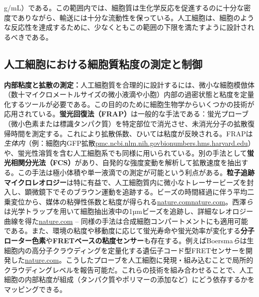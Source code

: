 \begin{itemize}
g/mL）である。この範囲内では、細胞質は生化学反応を促進するのに十分な密度でありながら、輸送には十分な流動性を保っている。人工細胞は、細胞のような反応性を達成するために、少なくともこの範囲の下限を満たすように設計されるべきである。
\end{itemize}

\subsection{人工細胞における細胞質粘度の測定と制御}

\textbf{内部粘度と拡散の測定：}人工細胞質を合理的に設計するには、微小な細胞模倣体（数十マイクロメートルサイズの微小液滴や小胞）内部の過密状態と粘度を定量化するツールが必要である。この目的のために細胞生物学からいくつかの技術が応用されている。\textbf{蛍光回復法（FRAP）}は一般的な手法である：蛍光プローブ（微小色素または標識タンパク質）を特定部位で消光させ、未消光分子の拡散復帰時間を測定する。これにより拡散係数、ひいては粘度が反映される。FRAPは\textit{生体内}（例：細胞内GFP拡散\href{https://pmc.ncbi.nlm.nih.gov/articles/PMC1184383/\#:~:text=Photobleaching\%20recovery\%20and\%20anisotropy\%20decay,2}{pmc.ncbi.nlm.nih.gov}\href{https://bionumbers.hms.harvard.edu/bionumber.aspx?id=102561&ver=2\#:~:text=Value\%203,S65T\%20in}{bionumbers.hms.harvard.edu}）や、蛍光性溶質を含む人工細胞系でも同様に用いられている。別の手法として\textbf{蛍光相関分光法（FCS）}があり、自発的な強度変動を解析して拡散速度を抽出する。この手法は極小体積や単一液滴での測定が可能という利点がある。\textbf{粒子追跡マイクロレオロジー}は特に有益で、人工細胞質内に微小なトレーサービーズを封入し、顕微鏡下でそのブラウン運動を追跡する。ビーズの時間経過に伴う平均二乗変位から、媒体の粘弾性係数と粘度が得られる\href{https://www.nature.com/articles/s41598-017-14883-y?error=cookies_not_supported&code=b0600d9e-c852-48ed-ab9c-7526a5c6893b\#:~:text=We\%20performed\%20high,As\%20detailed\%20later}{nature.com}\href{https://www.nature.com/articles/s41598-017-14883-y?error=cookies_not_supported&code=b0600d9e-c852-48ed-ab9c-7526a5c6893b\#:~:text=we\%20found\%20that\%20the\%20BSA,a\%20low\%20shear\%20rate\%20limit38}{nature.com}。西澤\textit{ら}は光学トラップを用いて細胞抽出液中の1µmビーズを追跡し、詳細なレオロジー曲線を得た\href{https://www.nature.com/articles/s41598-017-14883-y?error=cookies_not_supported&code=b0600d9e-c852-48ed-ab9c-7526a5c6893b\#:~:text=We\%20performed\%20high,The\%20viscosity\%20\%CE\%B7\%20of\%20the}{nature.com} – 同様の手法は合成細胞コンパートメントにも適用可能である。また、環境の粘度や移動度に応じて蛍光寿命や蛍光効率が変化する\textbf{分子ローター色素}や\textbf{FRETベースの粘度センサー}も存在する。例えばBoersma\textit{ら}は生細胞内の高分子クラウディングを定量化する遺伝子コード型FRETセンサーを開発した\href{https://www.nature.com/articles/nrmicro.2017.17?error=cookies_not_supported&code=87b4b2eb-5370-49be-862f-ed6bad1e1b44\#:~:text=Scholar\%20scholar}{nature.com}。こうしたプローブを人工細胞に発現・組み込むことで局所的クラウディングレベルを報告可能だ。これらの技術を組み合わせることで、人工細胞の内部粘度が組成（タンパク質やポリマーの添加など）にどう依存するかをマッピングできる。

